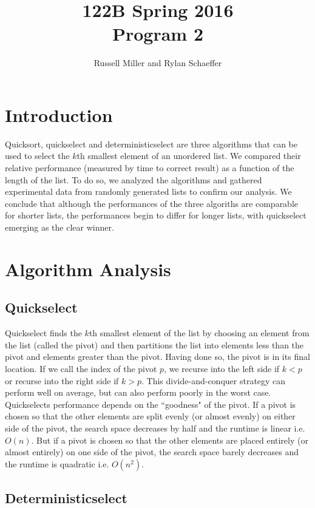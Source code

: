 \documentclass{article}
\title{122B Spring 2016 \\ Program 2}
\author{Russell Miller and Rylan Schaeffer }
\begin{document}
\maketitle

\section*{Introduction}
\indent \indent Quicksort, quickselect and deterministicselect are three algorithms that can be used to select the $k$th smallest element of an unordered list. We compared their relative performance (measured by time to correct result) as a function of the length of the list. To do so, we analyzed the algorithms and gathered experimental data from randomly generated lists to confirm our analysis. We conclude that although the performances of the three algoriths are comparable for shorter lists, the performances begin to differ for longer lists, with quickselect emerging as the clear winner.

\section*{Algorithm Analysis}
\subsection*{Quickselect}
\indent \indent Quickselect finds the $k$th smallest element of the list by choosing an element from the list (called the pivot) and then partitions the list into elements less than the pivot and elements greater than the pivot. Having done so, the pivot is in its final location. If we call the index of the pivot $p$, we recurse into the left side if $k < p$ or recurse into the right side if $k > p$. This divide-and-conquer strategy can perform well on average, but can also perform poorly in the worst case. Quickselects performance depends on the ``goodness" of the pivot. If a pivot is chosen so that the other elements are split evenly (or almost evenly) on either side of the pivot, the search space decreases by half and the runtime is linear i.e. $O(n)$. But if a pivot is chosen so that the other elements are placed entirely (or almost entirely) on one side of the pivot, the search space barely decreases and the runtime is quadratic i.e. $O(n^2)$.



\subsection*{Deterministicselect}
\indent \indent 
\end{document}
